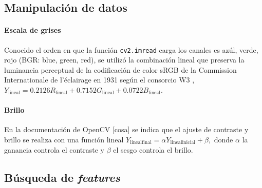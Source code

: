 \documentclass{article}
\begin{document}



\subsection{Manipulación de datos}

\paragraph{Escala de grises}
Conocido el orden en que la función \verb'cv2.imread' carga los canales es azúl, verde, rojo (BGR: blue, green, red), se utilizó la combinación lineal que preserva la luminancia perceptual de la codificación de color sRGB de la Commission Internationale de l'éclairage en 1931 según el consorcio W3 \cite{cosa}, $
Y_\mathrm{lineal} = 0.2126 R_\mathrm{lineal} + 0.7152 G_\mathrm{lineal} + 0.0722 B_\mathrm{lineal} .
$

\paragraph{Brillo}
En la documentación de OpenCV [cosa] se indica que el ajuste de contraste y brillo se realiza con una función lineal
$
Y_\mathrm{lineal final} = \alpha Y_\mathrm{lineal inicial} + \beta ,
$
donde $\alpha$ la ganancia controla el contraste y $\beta$ el sesgo controla el brillo.






\subsection{Búsqueda de \emph{features}}
\end{document}
